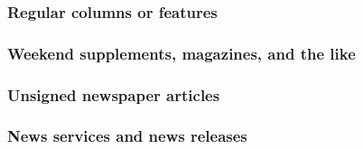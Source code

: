\documentclass[11pt,letterpaper,oneside]{article}
\begin{document}
\begin{citebib}
\item \cite{editorial1990}
\item \cite{royko1992}
\item \cite{forester2000}
\item \cite{samenow2016}
\end{citebib}

\setcounter{subsubsection}{194}
\subsubsection{Regular columns or features}

\begin{citebib}
\item \cite{jaffe2015}
\item \cite{editorial2015}
\end{citebib}

\setcounter{subsubsection}{196}
\subsubsection{Weekend supplements, magazines, and the like}

\begin{citebib}
\item \cite[48]{ghansah2015}
\end{citebib}

\setcounter{subsubsection}{198}
\subsubsection{Unsigned newspaper articles}

\begin{citebib}
\item \cite{nytimes2002}
\end{citebib}

\subsubsection{News services and news releases}

\begin{citebib}
\item \cite{ap2015}
\end{citebib}
\end{document}
